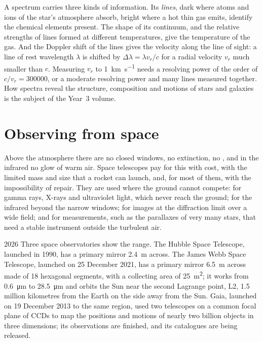 A spectrum carries three kinds of information. Its \emph{lines}, dark where
atoms and ions of the star's atmosphere absorb, bright where a hot thin gas
emits, identify the chemical elements present. The shape of its continuum,
and the relative strengths of lines formed at different temperatures, give
the temperature of the gas. And the Doppler shift of the lines gives the
velocity along the line of sight: a line of rest wavelength $\lambda$ is
shifted by $\Delta\lambda = \lambda v_r/c$ for a radial velocity $v_r$ much
smaller than $c$. Measuring $v_r$ to \qty{1}{km.s^{-1}} needs a resolving
power of the order of $c/v_r = \num{300000}$, or a moderate resolving power
and many lines measured together. How spectra reveal the structure,
composition and motions of stars and galaxies is the subject of the Year~3
volume.

\section{Observing from space}

Above the atmosphere there are no closed windows, no extinction, no ,
and in the infrared no glow of warm air. Space telescopes pay for this with
cost, with the limited mass and size that a rocket can launch, and, for most
of them, with the impossibility of repair. They are used where the ground
cannot compete: for gamma rays, X-rays and ultraviolet light, which never
reach the ground; for the infrared beyond the narrow windows; for images at
the diffraction limit over a wide field; and for measurements, such as
the parallaxes of very many stars, that need a stable instrument outside the
turbulent air.

\begin{dated}{2026}
Three space observatories show the range. The Hubble Space Telescope,
launched in 1990, has a primary mirror \qty{2.4}{m} across. The James Webb Space Telescope,
launched on 25 December 2021, has a primary mirror \qty{6.5}{m} across made
of 18 hexagonal segments, with a collecting area of \qty{25}{m^2}; it works
from \qty{0.6}{\micro\metre} to \qty{28.5}{\micro\metre} and orbits the Sun
near the second Lagrange point, L2, \num{1.5} million kilometres from the
Earth on the side away from the Sun.
Gaia, launched on 19 December 2013 to the same region, used two telescopes
on a common focal plane of CCDs to map the positions and motions of nearly
two billion objects in three dimensions; its observations are finished, and
its catalogues are being released.
\end{dated}

